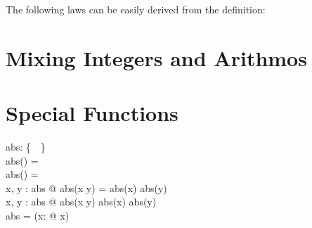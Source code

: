 \documentclass[12pt]{scrartcl}
\begin{document}
The following laws can be easily derived from the definition:

\section{Mixing Integers and Arithmos}
\label{sec:mixing}

\section{Special Functions}
\label{sec:special-functions}

\begin{axdef}
  abs: \arithmos \pfun \realplus \cup \{~\azero~\}\\
  \where
  abs(\azero) = \azero\\
  abs(\aone) = \aone\\
  \forall x, y : \dom abs @ abs(x \amult y) = abs(x) \amult abs(y)\\
  \forall x, y : \dom abs @ abs(x \aplus y) \aleq abs(x) \aplus
  abs(y)\\
  \real \dres abs = \id \real \oplus (\lambda x: \realminus @ \aneg x)\\
\end{axdef}

% 
\printbibliography{}

\end{document}
